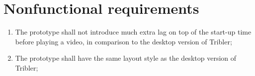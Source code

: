 \section{Nonfunctional requirements}

\begin{enumerate}
\item The prototype shall not introduce much extra lag on top of the start-up time before playing a video, in comparison to the desktop version of Tribler;

\item The prototype shall have the same layout style as the desktop version of Tribler;

\end{enumerate}